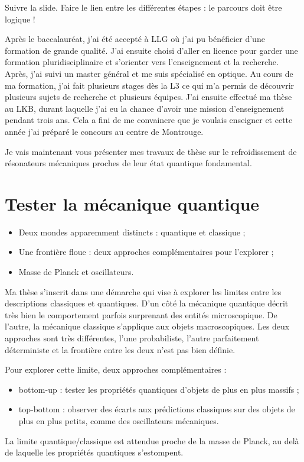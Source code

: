 \documentclass[12pt,a4paper]{article}
\newenvironment{transition}
{%
	\addcontentsline{ldf}{figure}{0}%
	\begin{transition2_env}}
	{\end{transition2_env}}
\newenvironment{slide}
	{%
		\addcontentsline{ldf}{figure}{0}%
		\begin{slide_env}}
		{\end{slide_env}
	}
\begin{document}
\begin{slide}
Suivre la slide.
Faire le lien entre les différentes étapes : le parcours doit être logique !
\end{slide}

Après le baccalauréat, j'ai été accepté à LLG où j'ai pu bénéficier d'une formation de grande qualité.
J'ai ensuite choisi d'aller en licence pour garder une formation pluridisciplinaire et s'orienter vers l'enseignement et la recherche.
Après, j'ai suivi un master général et me suis spécialisé en optique.
Au cours de ma formation, j'ai fait plusieurs stages dès la L3 ce qui m'a permis de découvrir plusieurs sujets de recherche et plusieurs équipes.
J'ai ensuite effectué ma thèse au LKB, durant laquelle j'ai eu la chance d'avoir une mission d'enseignement pendant trois ans.
Cela a fini de me convaincre que je voulais enseigner et cette année j'ai préparé le concours au centre de Montrouge.

\begin{transition}
Je vais maintenant vous présenter mes travaux de thèse sur le refroidissement de résonateurs mécaniques proches de leur état quantique fondamental.
\end{transition}

\section{Tester la mécanique quantique}

\begin{slide}
\begin{itemize}
\item Deux mondes apparemment distincts : quantique et classique ;
\item Une frontière floue : deux approches complémentaires pour l'explorer ;
\item Masse de Planck et oscillateurs.
\end{itemize}
\end{slide}

Ma thèse s'inscrit dans une démarche qui vise à explorer les limites entre les descriptions classiques et quantiques.
D'un côté la mécanique quantique décrit très bien le comportement parfois surprenant des entités microscopique.
De l'autre, la mécanique classique s'applique aux objets macroscopiques.
Les deux approches sont très différentes, l'une probabiliste, l'autre parfaitement déterministe et la frontière entre les deux n'est pas bien définie.

Pour explorer cette limite, deux approches complémentaires :
\begin{itemize}
\item bottom-up : tester les propriétés quantiques d'objets de plus en plus massifs ;
\item top-bottom : observer des écarts aux prédictions classiques sur des objets de plus en plus petits, comme des oscillateurs mécaniques.
\end{itemize}
La limite quantique/classique est attendue proche de la masse de Planck, au delà de laquelle les propriétés quantiques s'estompent.
\end{document}
